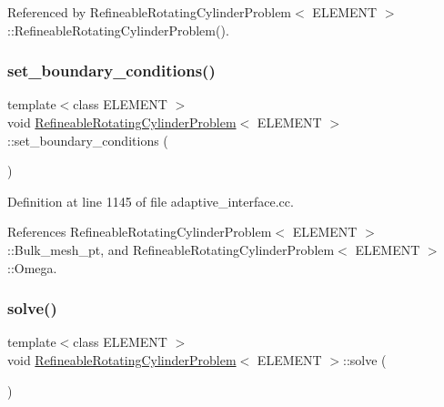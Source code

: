 Referenced by Refineable\+Rotating\+Cylinder\+Problem$<$ E\+L\+E\+M\+E\+N\+T $>$\+::\+Refineable\+Rotating\+Cylinder\+Problem().

\mbox{\label{classRefineableRotatingCylinderProblem_acd510f2c06fa3f38d2911781656dbf20}} 
\subsubsection{\texorpdfstring{set\+\_\+boundary\+\_\+conditions()}{set\_boundary\_conditions()}}
{\footnotesize\ttfamily template$<$class E\+L\+E\+M\+E\+NT $>$ \\
void \hyperlink{classRefineableRotatingCylinderProblem}{Refineable\+Rotating\+Cylinder\+Problem}$<$ E\+L\+E\+M\+E\+NT $>$\+::set\+\_\+boundary\+\_\+conditions (\begin{DoxyParamCaption}{ }\end{DoxyParamCaption})}



Definition at line 1145 of file adaptive\+\_\+interface.\+cc.



References Refineable\+Rotating\+Cylinder\+Problem$<$ E\+L\+E\+M\+E\+N\+T $>$\+::\+Bulk\+\_\+mesh\+\_\+pt, and Refineable\+Rotating\+Cylinder\+Problem$<$ E\+L\+E\+M\+E\+N\+T $>$\+::\+Omega.

\mbox{\label{classRefineableRotatingCylinderProblem_a664bfd373351a401619b06c3494fdcdc}} 
\subsubsection{\texorpdfstring{solve()}{solve()}}
{\footnotesize\ttfamily template$<$class E\+L\+E\+M\+E\+NT $>$ \\
void \hyperlink{classRefineableRotatingCylinderProblem}{Refineable\+Rotating\+Cylinder\+Problem}$<$ E\+L\+E\+M\+E\+NT $>$\+::solve (\begin{DoxyParamCaption}{ }\end{DoxyParamCaption})}



